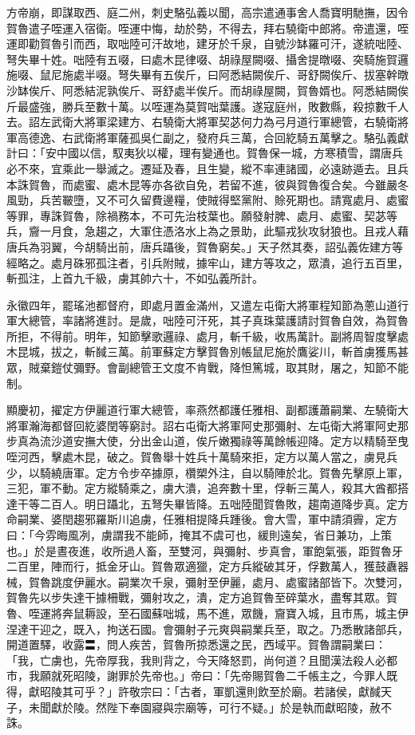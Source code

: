 \begin{pinyinscope}
 方帝崩，即謀取西、庭二州，刺史駱弘義以聞，高宗遣通事舍人喬寶明馳撫，因令賀魯遣子咥運入宿衛。咥運中悔，劫於勢，不得去，拜右驍衛中郎將。帝遣還，咥運即勸賀魯引而西，取咄陸可汗故地，建牙於千泉，自號沙缽羅可汗，遂統咄陸、弩失畢十姓。咄陸有五啜，曰處木昆律啜、胡祿屋闕啜、攝舍提暾啜、突騎施賀邏施啜、鼠尼施處半啜。弩失畢有五俟斤，曰阿悉結闕俟斤、哥舒闕俟斤、拔塞幹暾沙缽俟斤、阿悉結泥孰俟斤、哥舒處半俟斤。而胡祿屋闕，賀魯婿也。阿悉結闕俟斤最盛強，勝兵至數十萬。以咥運為莫賀咄葉護。遂寇庭州，敗數縣，殺掠數千人去。詔左武衛大將軍梁建方、右驍衛大將軍契苾何力為弓月道行軍總管，右驍衛將軍高德逸、右武衛將軍薩孤吳仁副之，發府兵三萬，合回紇騎五萬擊之。駱弘義獻計曰：「安中國以信，馭夷狄以權，理有變通也。賀魯保一城，方寒積雪，謂唐兵必不來，宜乘此一舉滅之。遷延及春，且生變，縱不率連諸國，必遠跡遁去。且兵本誅賀魯，而處蜜、處木昆等亦各欲自免，若留不進，彼與賀魯復合矣。今雖嚴冬風勁，兵苦皸墮，又不可久留費邊糧，使賊得堅黨附、賒死期也。請寬處月、處蜜等罪，專誅賀魯，除禍務本，不可先治枝葉也。願發射脾、處月、處蜜、契苾等兵，齎一月食，急趨之，大軍住憑洛水上為之景助，此驅戎狄攻豺狼也。且戎人藉唐兵為羽翼，今胡騎出前，唐兵躡後，賀魯窮矣。」天子然其奏，詔弘義佐建方等經略之。處月硃邪孤注者，引兵附賊，據牢山，建方等攻之，眾潰，追行五百里，斬孤注，上首九千級，虜其帥六十，不如弘義所計。



 永徽四年，罷瑤池都督府，即處月置金滿州，又遣左屯衛大將軍程知節為蔥山道行軍大總管，率諸將進討。是歲，咄陸可汗死，其子真珠葉護請討賀魯自效，為賀魯所拒，不得前。明年，知節擊歌邏祿、處月，斬千級，收馬萬計。副將周智度擊處木昆城，拔之，斬馘三萬。前軍蘇定方擊賀魯別帳鼠尼施於鷹娑川，斬首虜獲馬甚眾，賊棄鎧仗彌野。會副總管王文度不肯戰，降怛篤城，取其財，屠之，知節不能制。



 顯慶初，擢定方伊麗道行軍大總管，率燕然都護任雅相、副都護蕭嗣業、左驍衛大將軍瀚海都督回紇婆閏等窮討。詔右屯衛大將軍阿史那彌射、左屯衛大將軍阿史那步真為流沙道安撫大使，分出金山道，俟斤嫩獨祿等萬餘帳迎降。定方以精騎至曳咥河西，擊處木昆，破之。賀魯舉十姓兵十萬騎來拒，定方以萬人當之，虜見兵少，以騎繞唐軍。定方令步卒據原，欑槊外注，自以騎陣於北。賀魯先擊原上軍，三犯，軍不動。定方縱騎乘之，虜大潰，追奔數十里，俘斬三萬人，殺其大酋都搭達干等二百人。明日躡北，五弩失畢皆降。五咄陸聞賀魯敗，趨南道降步真。定方命嗣業、婆閏趨邪羅斯川追虜，任雅相提降兵踵後。會大雪，軍中請須霽，定方曰：「今雰晦風冽，虜謂我不能師，掩其不虞可也，緩則遠矣，省日兼功，上策也。」於是晝夜進，收所過人畜，至雙河，與彌射、步真會，軍飽氣張，距賀魯牙二百里，陣而行，抵金牙山。賀魯眾適獵，定方兵縱破其牙，俘數萬人，獲鼓纛器械，賀魯跳度伊麗水。嗣業次千泉，彌射至伊麗，處月、處蜜諸部皆下。次雙河，賀魯先以步失達干據柵戰，彌射攻之，潰，定方追賀魯至碎葉水，盡奪其眾。賀魯、咥運將奔鼠耨設，至石國蘇咄城，馬不進，眾饑，齎寶入城，且市馬，城主伊涅達干迎之，既入，拘送石國。會彌射子元爽與嗣業兵至，取之。乃悉散諸部兵，開道置驛，收露〓，問人疾苦，賀魯所掠悉還之民，西域平。賀魯謂嗣業曰：「我，亡虜也，先帝厚我，我則背之，今天降怒罰，尚何道？且聞漢法殺人必都市，我願就死昭陵，謝罪於先帝也。」帝曰：「先帝賜賀魯二千帳主之，今罪人既得，獻昭陵其可乎？」許敬宗曰：「古者，軍凱還則飲至於廟。若諸侯，獻馘天子，未聞獻於陵。然陛下奉園寢與宗廟等，可行不疑。」於是執而獻昭陵，赦不誅。




\end{pinyinscope}
